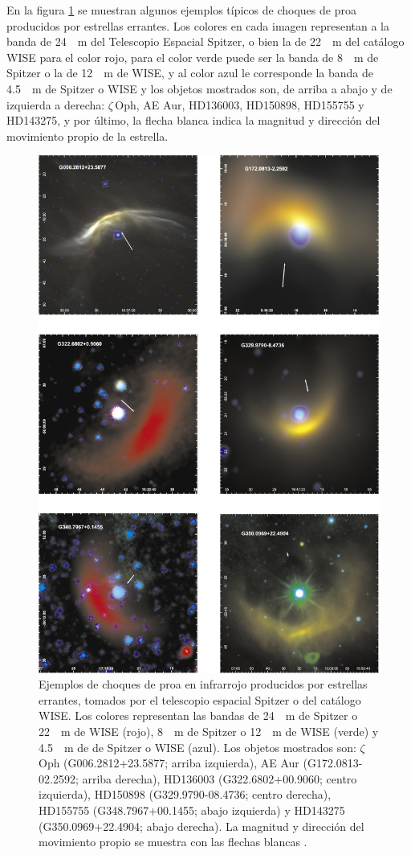 En la figura \ref{fig:runaway} se muestran algunos ejemplos típicos de choques de proa producidos por estrellas errantes. Los colores en cada imagen representan a la banda de \SI{24}{\mu.m} del Telescopio Espacial Spitzer, o bien la de \SI{22}{\mu.m} del catálogo WISE para el color rojo, para el color verde puede ser la banda de \SI{8}{\mu.m} de Spitzer o la de \SI{12}{\mu.m} de WISE, y al color azul le corresponde la banda de \SI{4.5}{\mu.m} de Spitzer o WISE y los objetos mostrados son, de arriba a abajo y de izquierda a derecha: $\zeta$\,Oph, AE Aur, HD136003, HD150898, HD155755 y HD143275, y por último, la flecha blanca indica la magnitud y dirección del movimiento propio de la estrella.

\begin{figure}
  \centering
  \includegraphics[width=0.7\linewidth]{./Figures/kobulnicky}
  \caption{Ejemplos de choques de proa en infrarrojo producidos por estrellas errantes, tomados por el telescopio espacial Spitzer o del catálogo WISE. Los colores representan las bandas de \SI{24}{\mu.m} de Spitzer o \SI{22}{\mu.m} de WISE (rojo), \SI{8}{\mu.m} de Spitzer o \SI{12}{\mu.m} de WISE (verde) y \SI{4.5}{\mu.m} de de Spitzer o WISE (azul). Los objetos mostrados son: $\zeta$\, Oph (G006.2812+23.5877; arriba izquierda), AE Aur (G172.0813-02.2592; arriba derecha), HD136003 (G322.6802+00.9060; centro izquierda), HD150898 (G329.9790-08.4736; centro derecha), HD155755 (G348.7967+00.1455; abajo izquierda) y HD143275 (G350.0969+22.4904; abajo derecha). La magnitud y dirección del movimiento propio se muestra con las flechas blancas \citep{Kobulnicky:2016}.}
  \label{fig:runaway}
\end{figure}

